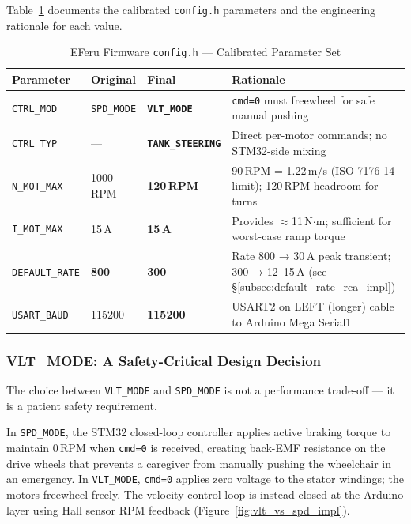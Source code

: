 \documentclass[12pt,a4paper]{report}
\begin{document}
Table~\ref{tab:firmware_params_impl} documents the calibrated \texttt{config.h}
parameters and the engineering rationale for each value.

\begin{table}[H]
\centering
\caption{EFeru Firmware \texttt{config.h} — Calibrated Parameter Set}
\label{tab:firmware_params_impl}
\begin{tabular}{@{}p{3.4cm} p{2.4cm} p{2.4cm} p{5.2cm}@{}}
\toprule
\rowcolor{rafblue!20}
\textbf{Parameter} & \textbf{Original} & \textbf{Final} & \textbf{Rationale} \\
\midrule
\texttt{CTRL\_MOD}    & \texttt{SPD\_MODE} & \textbf{\texttt{VLT\_MODE}}
  & \texttt{cmd=0} must freewheel for safe manual pushing \\
\texttt{CTRL\_TYP}    & ---                & \textbf{\texttt{TANK\_STEERING}}
  & Direct per-motor commands; no STM32-side mixing \\
\texttt{N\_MOT\_MAX}  & 1000\,RPM          & \textbf{120\,RPM}
  & 90\,RPM = 1.22\,m/s (ISO 7176-14 limit); 120\,RPM headroom for turns \\
\texttt{I\_MOT\_MAX}  & 15\,A              & \textbf{15\,A}
  & Provides $\approx$11\,N$\cdot$m; sufficient for worst-case ramp torque \\
\texttt{DEFAULT\_RATE}& \textbf{800}       & \textbf{300}
  & Rate 800 → 30\,A peak transient; 300 → 12–15\,A (see §\ref{subsec:default_rate_rca_impl}) \\
\texttt{USART\_BAUD}  & 115200             & \textbf{115200}
  & USART2 on LEFT (longer) cable to Arduino Mega Serial1 \\
\bottomrule
\end{tabular}
\end{table}

\subsubsection{VLT\_MODE: A Safety-Critical Design Decision}
\label{subsec:vlt_mode_impl}

The choice between \texttt{VLT\_MODE} and \texttt{SPD\_MODE} is not a
performance trade-off — it is a patient safety requirement.

In \texttt{SPD\_MODE}, the STM32 closed-loop controller applies active braking
torque to maintain 0\,RPM when \texttt{cmd=0} is received, creating
back-EMF resistance on the drive wheels that prevents a caregiver from
manually pushing the wheelchair in an emergency. In \texttt{VLT\_MODE},
\texttt{cmd=0} applies zero voltage to the stator windings; the motors freewheel
freely. The velocity control loop is instead closed at the Arduino layer using
Hall sensor RPM feedback (Figure~\ref{fig:vlt_vs_spd_impl}).
\end{document}
